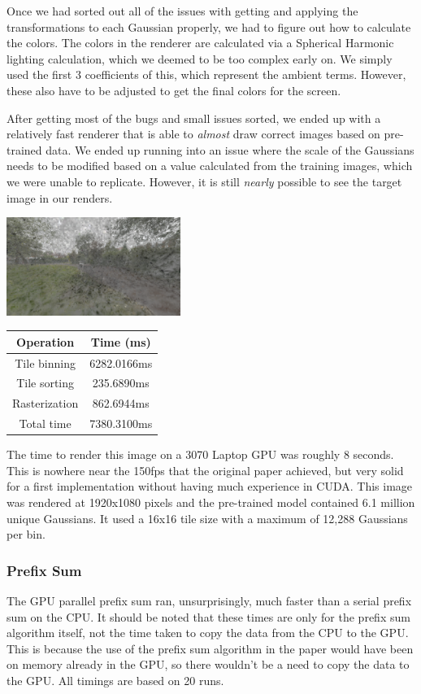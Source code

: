\documentclass[12pt, a4paper, twocolumn]{article}
\begin{document}
Once we had sorted out all of the issues with getting and applying the transformations to each Gaussian properly, we had to figure out how to calculate the colors. The colors in the renderer are calculated via a Spherical Harmonic lighting calculation, which we deemed to be too complex early on. We simply used the first 3 coefficients of this, which represent the ambient terms. However, these also have to be adjusted to get the final colors for the screen.

After getting most of the bugs and small issues sorted, we ended up with a relatively fast renderer that is able to \textit{almost} draw correct images based on pre-trained data. We ended up running into an issue where the scale of the Gaussians needs to be modified based on a value calculated from the training images, which we were unable to replicate. However, it is still \textit{nearly} possible to see the target image in our renders.

\includegraphics[width=0.425\textwidth]{test.png}

\begin{center}
\begin{tabular}{ | c | c | }
\hline
Operation & Time (ms) \\
\hline
Tile binning & 6282.0166ms \\
\hline
Tile sorting & 235.6890ms \\
\hline
Rasterization & 862.6944ms \\
\hline
Total time & 7380.3100ms \\
\hline
\end{tabular}
\end{center}

The time to render this image on a 3070 Laptop GPU was roughly 8 seconds. This is nowhere near the 150fps that the original paper achieved, but very solid for a first implementation without having much experience in CUDA. This image was rendered at 1920x1080 pixels and the pre-trained model contained 6.1 million unique Gaussians. It used a 16x16 tile size with a maximum of 12,288 Gaussians per bin.

\subsubsection{Prefix Sum}
The GPU parallel prefix sum ran, unsurprisingly, much faster than a serial prefix sum on the CPU. It should be noted that these times are only for the prefix sum algorithm itself, not the time taken to copy the data from the CPU to the GPU. This is because the use of the prefix sum algorithm in the paper would have been on memory already in the GPU, so there wouldn't be a need to copy the data to the GPU.
All timings are based on 20 runs.
\end{document}
